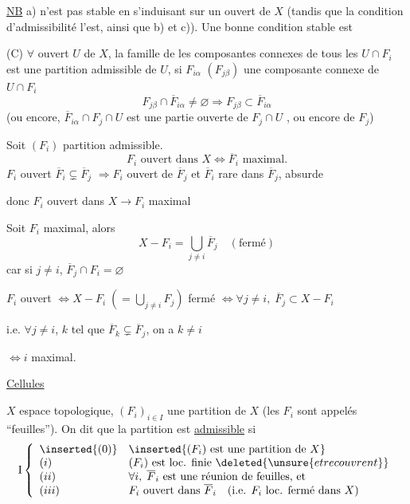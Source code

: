 \uline{NB} a) n'est pas stable en s'induisant sur un ouvert de $X$ (tandis que la condition d'admissibilité l'est, ainsi que b) et c)). Une bonne condition stable est


(C) $\forall$ ouvert $U$ de $X$, la famille de  les composantes connexes de tous les $U\cap F_i$ est une partition admissible de $U$,
  si $F_{i\alpha}$ $(F_{j\beta})$ une composante connexe de $U\cap F_i$  
\[
F_{j\beta}\cap\overline F_{i\alpha}\neq\varnothing
\Longrightarrow F_{j\beta}\subset\overline F_{i\alpha}
\]
(ou encore, $\overline F_{i\alpha}\cap F_j\cap U$ est une partie ouverte de $F_j\cap U$ , ou encore de $F_j$)

Soit $(F_i)$ partition admissible.
\[
F_i\text{ ouvert dans }X\Longleftrightarrow\overline F_i\text{ maximal.}
\]
$F_i$ ouvert  $\overline F_i\subsetneq\overline F_j$
$\Rightarrow F_i$ ouvert \inserted{$\neq\varnothing$} de $\overline F_j$ et $\overline F_i$ rare dans $\overline F_j$, absurde

donc $F_i$ ouvert dans $X\longrightarrow F_i$ maximal

Soit $F_i$ maximal, alors
\[
X-F_i=\bigcup_{j\neq i}\overline F_j\quad(\text{fermé})
\]
car  si $j\neq i$, $\overline F_j\cap F_i=\varnothing$

$F_i$ ouvert $\Longleftrightarrow X-F_i\;(=\bigcup_{j\neq i}F_j)$ fermé
$\Longleftrightarrow\forall j\neq i,\;\overline F_j\subset X-F_i$

i.e. $\forall j\neq i$,  $k$ tel que $\overline F_k\subsetneq\overline F_j$, on a $k\neq i$

$\Longleftrightarrow i$ maximal.


\uline{Cellules}

$X$ espace topologique, $(F_i)_{i\in I}$ une partition de $X$ (les $F_i$ sont appelés ``feuilles''). On dit que la partition est \uline{admissible} si
\[
\mathrm I\left\{\begin{array}{ll}
\inserted{(0)}&\inserted{(F_i)\text{ est une partition de }X}\\
(i)&(F_i)\text{ est loc. finie }\deleted{\unsure{et recouvrent}}\\
(ii)&\forall i,\;\overline F_i\text{ est une réunion de feuilles, et}\\
(iii)&F_i\text{ ouvert dans }\overline F_i\quad(\text{i.e. }F_i\text{ loc. fermé dans }X)
\end{array}\right.
\]


